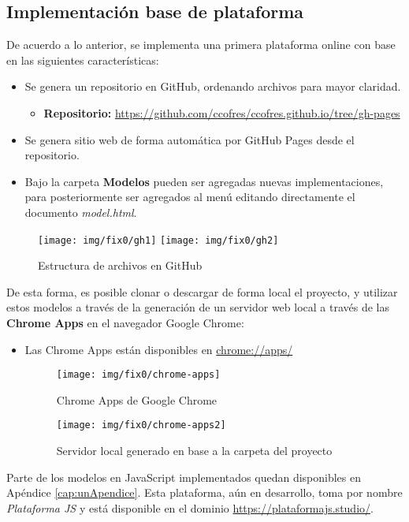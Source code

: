 \clearpage
\subsection{Implementación base de plataforma}
De acuerdo a lo anterior, se implementa una primera plataforma online con base en las siguientes características:
\begin{itemize}
  \item Se genera un repositorio en GitHub, ordenando archivos para mayor claridad.
  \begin{itemize}
    \item \textbf{Repositorio:} \url{https://github.com/ccofres/ccofres.github.io/tree/gh-pages}
  \end{itemize}
  \item Se genera sitio web de forma automática por GitHub Pages desde el repositorio.
  \item Bajo la carpeta \textbf{Modelos} pueden ser agregadas nuevas implementaciones, para posteriormente ser agregados al menú editando directamente el documento \emph{model.html}.
\end{itemize}

\begin{figure}[H]
  \texttt{[image: img/fix0/gh1]}
  \texttt{[image: img/fix0/gh2]}
  \centering
  \caption{Estructura de archivos en GitHub}
  \label{fig:gh-pages}
\end{figure}

De esta forma, es posible clonar o descargar de forma local el proyecto, y utilizar estos modelos a través de la generación de un servidor web local a través
de las \textbf{Chrome Apps} en el navegador Google Chrome:
\begin{itemize}
  \item Las Chrome Apps están disponibles en \url{chrome://apps/}
  \begin{figure}[H]
    \texttt{[image: img/fix0/chrome-apps]}
    \centering
    \caption{Chrome Apps de Google Chrome}
    \label{fig:chrome-apps}
  \end{figure}

  \begin{figure}[H]
    \texttt{[image: img/fix0/chrome-apps2]}
    \centering
    \caption{Servidor local generado en base a la carpeta del proyecto }
    \label{fig:chrome-apps2}
  \end{figure}
\end{itemize}
Parte de los modelos en JavaScript implementados quedan disponibles en Apéndice \ref{cap:unApendice}.
Esta plataforma, aún en desarrollo, toma por nombre \emph{Plataforma JS} y está disponible en el dominio \url{https://plataformajs.studio/}.